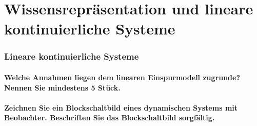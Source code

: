 \part{Wissensrepräsentation und lineare kontinuierliche Systeme}
\section{Lineare kontinuierliche Systeme}
\subsection{Welche Annahmen liegen dem linearen Einspurmodell zugrunde? Nennen Sie mindestens 5 Stück.}
\subsection{Zeichnen Sie ein Blockschaltbild eines dynamischen Systems mit Beobachter. Beschriften Sie das
    Blockschaltbild sorgfältig.}
